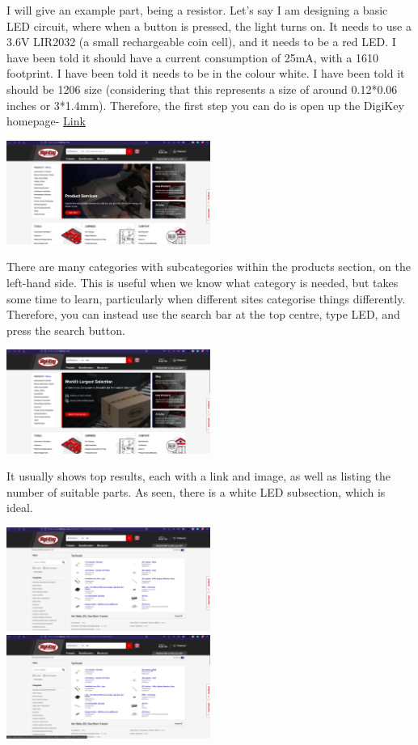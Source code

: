 \documentclass[a4paper,11pt]{report}
\begin{document}
I will give an example part, being a resistor. Let's say I am designing a basic LED circuit, where when a button is pressed, the light turns on. It needs to use a 3.6V LIR2032 (a small rechargeable coin cell), and it needs to be a red LED. I have been told it should have a current consumption of 25mA, with a  1610 footprint. I have been told it needs to be in the colour white. I have been told it should be 1206 size (considering that this represents a size of around 0.12*0.06 inches or 3*1.4mm).
Therefore, the first step you can do is open up the DigiKey homepage- \href{https://www.DigiKey.co.uk/}{Link}

\includegraphics[width=0.5\textwidth]{screenshots/DigiKeyHome}

There are many categories with subcategories within the products section, on the left-hand side. This is useful when we know what category is needed, but takes some time to learn, particularly when different sites categorise things differently. Therefore, you can instead use the search bar at the top centre, type LED, and press the search button.

\includegraphics[width=0.5\textwidth]{screenshots/DigiKeyHomeLEDSearch}

It usually shows top results, each with a link and image, as well as listing the number of suitable parts. As seen, there is a white LED subsection, which is ideal.

\includegraphics[width=0.5\textwidth]{screenshots/DigiKeyLEDSearched}
\includegraphics[width=0.5\textwidth]{screenshots/DigiKeyWhiteLEDSectionFound}
\end{document}

